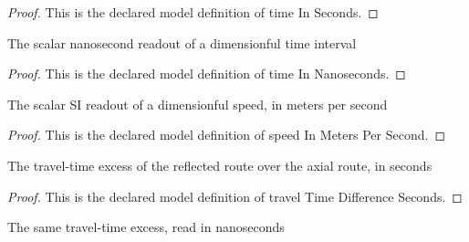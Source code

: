 \begin{proof}
  This is the declared model definition of time In Seconds.
\end{proof}
\begin{definition}
  \label{def:physics:phyx-mini-0086:phyxminiproblems-problemphyxmini0086-timeinnanoseconds}
  The scalar nanosecond readout of a dimensionful time interval
\end{definition}
\begin{proof}
  This is the declared model definition of time In Nanoseconds.
\end{proof}
\begin{definition}
  \label{def:physics:phyx-mini-0086:phyxminiproblems-problemphyxmini0086-speedinmeterspersecond}
  The scalar SI readout of a dimensionful speed, in meters per second
\end{definition}
\begin{proof}
  This is the declared model definition of speed In Meters Per Second.
\end{proof}
\begin{definition}
  \label{def:physics:phyx-mini-0086:phyxminiproblems-problemphyxmini0086-traveltimedifferenceseconds}
  The travel-time excess of the reflected route over the axial route, in seconds
\end{definition}
\begin{proof}
  This is the declared model definition of travel Time Difference Seconds.
\end{proof}
\begin{definition}
  \label{def:physics:phyx-mini-0086:phyxminiproblems-problemphyxmini0086-traveltimedifferencenanoseconds}
  The same travel-time excess, read in nanoseconds
\end{definition}
